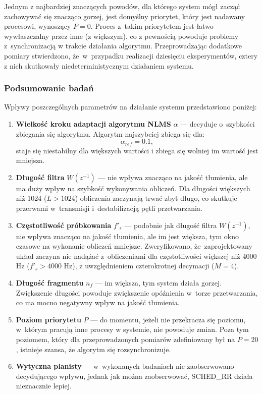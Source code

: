 Jednym z najbardziej znaczących powodów, dla którego system mógł zacząć
zachowywać się znacząco gorzej, jest domyślny priorytet, który jest nadawany
procesowi, wynoszący $P = 0$. Proces z~takim priorytetem jest łatwo
wywłaszczalny przez inne (z większym), co z pewnością powoduje problemy
z~synchronizacją w trakcie działania algorytmu. Przeprowadzając dodatkowe
pomiary stwierdzono, że~w~przypadku realizacji dziesięciu eksperymentów, cztery
z nich skutkowały niedeterministycznym działaniem systemu.

\subsubsection{Podsumowanie badań}

Wpływy poszczególnych parametrów na działanie systemu
przedstawiono poniżej:

\begin{enumerate}
    \item \textbf{Wielkość kroku adaptacji algorytmu NLMS} $\alpha$ --- decyduje
    o~szybkości zbiegania się algorytmu. Algorytm najszybciej zbiega się dla:
    \begin{equation}
        \alpha_{ref} = 0.1,
    \end{equation}
    staje się niestabilny dla większych wartości i zbiega się wolniej im wartość
    jest mniejsza.

    \item \textbf{Długość filtra} $W(z^{-1})$ --- nie wpływa znacząco na jakość
    tłumienia, ale ma duży wpływ na szybkość wykonywania obliczeń. Dla długości
    większych niż 1024 ($L > 1024$) obliczenia zaczynają trwać zbyt długo, co
    skutkuje przerwami w~transmisji i~destabilizacją pętli przetwarzania.

    \item \textbf{Częstotliwość próbkowania} $f'_s$ --- podobnie jak długość filtra
    $W(z^{-1})$, nie wpływa znacząco na jakość tłumienia, ale im jest większa,
    tym okno czasowe na wykonanie obliczeń mniejsze. Zweryfikowano,
    że~zaprojektowany układ zaczyna nie nadążać z~obliczeniami dla
    częstotliwości większej niż 4000 Hz ($f'_s > 4000$ Hz), z uwzględnieniem
    czterokrotnej decymacji ($M = 4$).

    \item \textbf{Długość fragmentu} $n_f$ --- im większa, tym system działa gorzej.
    Zwiększenie długości powoduje zwiększenie opóźnienia w~torze przetwarzania,
    co ma mocno negatywny wpływ na jakość tłumienia.

    \item \textbf{Poziom priorytetu} $P$ --- do momentu, jeżeli nie przekracza się
    poziomu, w~którym pracują inne procesy w systemie, nie powoduje zmian. Poza
    tym poziomem, który dla przeprowadzonych pomiarów zdefiniowany był na $P =
    20$, istnieje szansa, że algorytm się rozsynchronizuje.

    \item \textbf{Wytyczna planisty} --- w~wykonanych badaniach nie
    zaobserwowano decydującego wpływu, jednak jak można zaobserwować, SCHED\_RR
    działa nieznacznie lepiej.
\end{enumerate}

